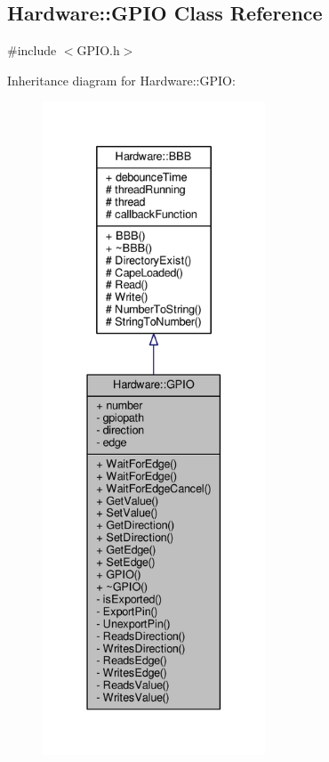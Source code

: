 \hypertarget{class_hardware_1_1_g_p_i_o}{}\subsection{Hardware\+:\+:G\+P\+I\+O Class Reference}
\label{class_hardware_1_1_g_p_i_o}


{\ttfamily \#include $<$G\+P\+I\+O.\+h$>$}



Inheritance diagram for Hardware\+:\+:G\+P\+I\+O\+:
\nopagebreak
\begin{figure}[H]
\begin{center}
\leavevmode
\includegraphics[height=550pt]{class_hardware_1_1_g_p_i_o__inherit__graph}
\end{center}
\end{figure}


